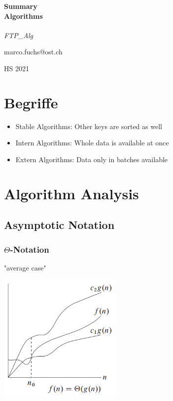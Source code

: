 \documentclass[10pt,a4paper,twocolumn]{article}
\begin{document}
\begin{center}
\textbf{Summary\\ Algorithms\\}
\mbox{}\\
\textit{FTP\_Alg}

\vspace{10pt}

marco.fuchs@ost.ch\\




\vspace{10pt}

HS 2021
\end{center}

\section{Begriffe}
\begin{itemize}
	\item Stable Algorithms: Other keys are sorted as well
	\item Intern Algorithms: Whole data is available at once
	\item Extern Algorithms: Data only in batches available
\end{itemize}


\section{Algorithm Analysis}
\subsection{Asymptotic Notation}
\subsubsection{$\Theta$-Notation}
"average case"
\begin{center}
\includegraphics[width=6cm]{images/asymptotische-notation-theta.png}
\end{center}
\end{document}
